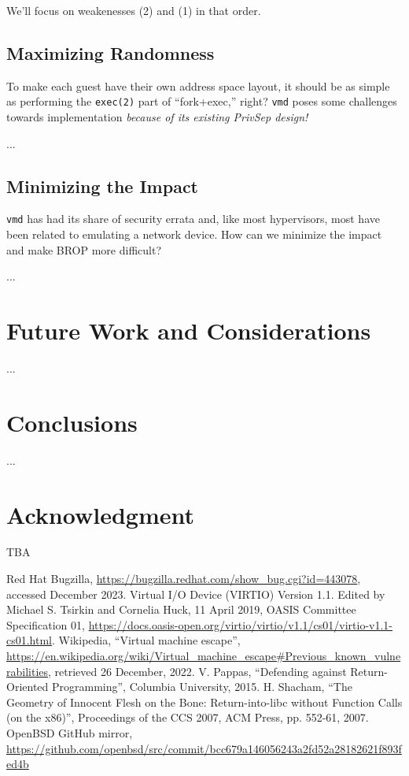 \documentclass[conference]{IEEEtran}
\begin{document}
We'll focus on weakenesses (2) and (1) in that order.

\subsection{Maximizing Randomness}
To make each guest have their own address space layout, it should be
as simple as performing the \texttt{exec(2)} part of ``fork+exec,''
right? \texttt{vmd} poses some challenges towards implementation \emph{because of its existing PrivSep design!}

...

\subsection{Minimizing the Impact}
\texttt{vmd} has had its share of security errata and, like most
hypervisors, most have been related to emulating a network device. How
can we minimize the impact and make BROP more difficult?

...

\section{Future Work and Considerations}

...

\section{Conclusions}

...

\section*{Acknowledgment}

TBA

\begin{thebibliography}{00}
 Red Hat Bugzilla, \url{https://bugzilla.redhat.com/show_bug.cgi?id=443078}, accessed December 2023.
 Virtual I/O Device (VIRTIO) Version 1.1. Edited by Michael S. Tsirkin and Cornelia Huck, 11 April 2019, OASIS Committee Specification 01, \url{https://docs.oasis-open.org/virtio/virtio/v1.1/cs01/virtio-v1.1-cs01.html}.
 Wikipedia, ``Virtual machine escape'', \url{https://en.wikipedia.org/wiki/Virtual_machine_escape#Previous_known_vulnerabilities}, retrieved 26 December, 2022.
   V. Pappas, ``Defending against Return-Oriented Programming'', Columbia University, 2015.
 H. Shacham, ``The Geometry of Innocent Flesh on the Bone:
  Return-into-libc without Function Calls (on the x86)'', Proceedings of the CCS 2007, ACM Press, pp. 552-61, 2007.
 OpenBSD GitHub mirror, \url{https://github.com/openbsd/src/commit/bcc679a146056243a2fd52a28182621f893fed4b}
\end{thebibliography}
\end{document}
